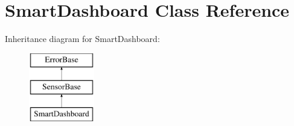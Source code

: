 \hypertarget{classSmartDashboard}{
\section{SmartDashboard Class Reference}
\label{classSmartDashboard}
}
Inheritance diagram for SmartDashboard:\begin{figure}[H]
\begin{center}
\leavevmode
\includegraphics[height=3.000000cm]{classSmartDashboard}
\end{center}
\end{figure}
